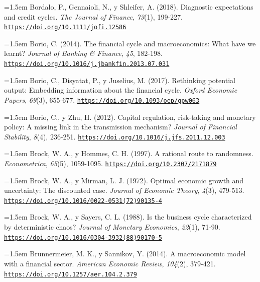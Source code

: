 \documentclass[10pt,a4paper]{article}
\begin{document}
\noindent\hangindent=1.5em Bordalo, P., Gennaioli, N., y Shleifer, A. (2018). Diagnostic expectations and credit cycles. \textit{The Journal of Finance}, \textit{73}(1), 199-227. \href{https://doi.org/10.1111/jofi.12586}{\nolinkurl{https://doi.org/10.1111/jofi.12586}}

\noindent\hangindent=1.5em Borio, C. (2014). The financial cycle and macroeconomics: What have we learnt? \textit{Journal of Banking \& Finance}, \textit{45}, 182-198. \href{https://doi.org/10.1016/j.jbankfin.2013.07.031}{\nolinkurl{https://doi.org/10.1016/j.jbankfin.2013.07.031}}

\noindent\hangindent=1.5em Borio, C., Disyatat, P., y Juselius, M. (2017). Rethinking potential output: Embedding information about the financial cycle. \textit{Oxford Economic Papers}, \textit{69}(3), 655-677. \href{https://doi.org/10.1093/oep/gpw063}{\nolinkurl{https://doi.org/10.1093/oep/gpw063}}

{\sloppy\noindent\hangindent=1.5em Borio, C., y Zhu, H. (2012). Capital regulation, risk-taking and monetary policy: A missing link in the transmission mechanism? \textit{Journal of Financial Stability}, \textit{8}(4), 236-251. \href{https://doi.org/10.1016/j.jfs.2011.12.003}{\nolinkurl{https://doi.org/10.1016/j.jfs.2011.12.003}}\par}

\noindent\hangindent=1.5em Brock, W. A., y Hommes, C. H. (1997). A rational route to randomness. \textit{Econometrica}, \textit{65}(5), 1059-1095. \href{https://doi.org/10.2307/2171879}{\nolinkurl{https://doi.org/10.2307/2171879}}

\noindent\hangindent=1.5em Brock, W. A., y Mirman, L. J. (1972). Optimal economic growth and uncertainty: The discounted case. \textit{Journal of Economic Theory}, \textit{4}(3), 479-513. \href{https://doi.org/10.1016/0022-0531(72)90135-4}{\nolinkurl{https://doi.org/10.1016/0022-0531(72)90135-4}}

\noindent\hangindent=1.5em Brock, W. A., y Sayers, C. L. (1988). Is the business cycle characterized by deterministic chaos? \textit{Journal of Monetary Economics}, \textit{22}(1), 71-90. \href{https://doi.org/10.1016/0304-3932(88)90170-5}{\nolinkurl{https://doi.org/10.1016/0304-3932(88)90170-5}}

\noindent\hangindent=1.5em Brunnermeier, M. K., y Sannikov, Y. (2014). A macroeconomic model with a financial sector. \textit{American Economic Review}, \textit{104}(2), 379-421. \href{https://doi.org/10.1257/aer.104.2.379}{\nolinkurl{https://doi.org/10.1257/aer.104.2.379}}
\end{document}
